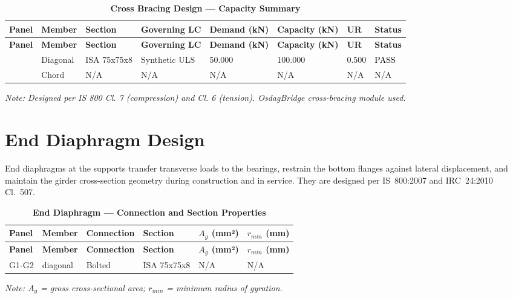 \documentclass[12pt,a4paper]{report}
\numberwithin{table}{chapter}
\numberwithin{figure}{chapter}
\newcommand{\ReportTableSetup}{%
  \setlength{\tabcolsep}{3.0pt}%
  \renewcommand{\arraystretch}{1.18}%
  \setlength{\arrayrulewidth}{0.4pt}\setlength{\extrarowheight}{0.5pt}%
  \setlength{\LTleft}{\fill}\setlength{\LTright}{\fill}%
  \setlength{\LTpre}{4pt}\setlength{\LTpost}{8pt}}
\newcommand{\ReportTableFont}{\small}
\newcommand{\ReportRowGap}{3.0pt}
\newcommand{\ReportTableGap}{\vspace{0.5em}}
\begin{document}
\ReportTableGap
\begingroup
\ReportTableSetup
\ReportTableFont
\begin{longtable}{|C{1.9406cm}|L{1.7465cm}|C{2.1346cm}|C{2.9109cm}|C{1.7465cm}|C{1.7465cm}|C{1.1643cm}|C{1.7465cm}|}
\caption{\textbf{Cross Bracing Design --- Capacity Summary}}\\
\hline
\textbf{Panel} & \textbf{Member} & \textbf{Section} & \textbf{Governing LC} & \textbf{Demand (kN)} & \textbf{Capacity (kN)} & \textbf{UR} & \textbf{Status} \\[\ReportRowGap]
\hline
\endfirsthead
\hline
\textbf{Panel} & \textbf{Member} & \textbf{Section} & \textbf{Governing LC} & \textbf{Demand (kN)} & \textbf{Capacity (kN)} & \textbf{UR} & \textbf{Status} \\[\ReportRowGap]
\hline
\endhead
\hline
\endfoot
\hline
\endlastfoot

 & Diagonal & ISA 75x75x8 & Synthetic ULS & 50.000 & 100.000 & 0.500 & \textcolor{black}{PASS} \\[\ReportRowGap]\hline
  & Chord & N/A & N/A & N/A & N/A & N/A & N/A \\[\ReportRowGap]\hline
\hline
\end{longtable}
\endgroup
\noindent\textit{Note: Designed per IS 800 Cl. 7 (compression) and Cl. 6 (tension). OsdagBridge cross-bracing module used.}

\section{End Diaphragm Design}
\label{sec:end-diaphragm}

End diaphragms at the supports transfer transverse loads to the bearings, restrain the bottom flanges against lateral displacement, and maintain the girder cross-section geometry during construction and in service. They are designed per IS~800:2007 and IRC~24:2010 Cl.~507.

\ReportTableGap

\ReportTableGap
\noindent




\begingroup
\ReportTableSetup
\ReportTableFont
\begin{longtable}{|C{2.0000cm}|L{2.0000cm}|L{2.2000cm}|C{2.5000cm}|C{2.0000cm}|C{2.0000cm}|}
\caption{\textbf{End Diaphragm --- Connection and Section Properties}}\\
\hline
\textbf{Panel} & \textbf{Member} & \textbf{Connection} & \textbf{Section} & \textbf{$A_g$ (mm²)} & \textbf{$r_{min}$ (mm)} \\[\ReportRowGap]
\hline
\endfirsthead
\hline
\textbf{Panel} & \textbf{Member} & \textbf{Connection} & \textbf{Section} & \textbf{$A_g$ (mm²)} & \textbf{$r_{min}$ (mm)} \\[\ReportRowGap]
\hline
\endhead
\hline
\endfoot
\hline
\endlastfoot

G1-G2 & diagonal & Bolted & ISA 75x75x8 & N/A & N/A \\[\ReportRowGap] \hline
\end{longtable}
\endgroup
\noindent\textit{Note: $A_g$ = gross cross-sectional area; $r_{min}$ = minimum radius of gyration.}
\end{document}
